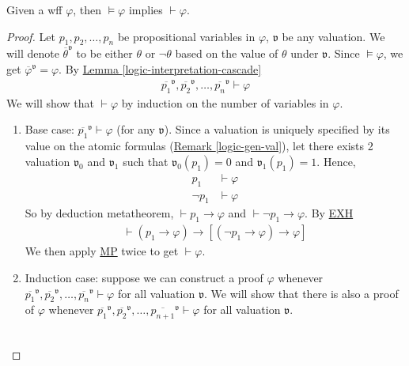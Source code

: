 \documentclass{treatise}
\begin{document}
\begin{theorem}
Given a wff $\varphi$, then $\vDash \varphi$ implies $\vdash \varphi$.
\end{theorem}
\begin{proof}
Let $p_1, p_2, \hdots, p_n$ be propositional variables in $\varphi$, $\mathfrak{v}$ be any valuation. We will denote $\overline{\theta}^\mathfrak{v}$ to be either $\theta$ or $\neg \theta$ based on the value of $\theta$ under $\mathfrak{v}$. Since $\vDash \varphi$, we get $\overline{\varphi}^\mathfrak{v} = \varphi$. By \hyperref[logic-interpretation-cascade]{Lemma \ref*{logic-interpretation-cascade}}
\begin{align*}
    \overline{p_1}^\mathfrak{v}, \overline{p_2}^\mathfrak{v}, \hdots, \overline{p_n}^\mathfrak{v} \vdash \varphi
\end{align*}
We will show that $\vdash \varphi$ by induction on the number of variables in $\varphi$.
\begin{enumerate}
    \item Base case: $\overline{p_1}^\mathfrak{v} \vdash \varphi$ (for any $\mathfrak{v}$). Since a valuation is uniquely specified by its value on the atomic formulas (\hyperref[logic-gen-val]{Remark \ref*{logic-gen-val}}), let there exists 2 valuation $\mathfrak{v}_0$ and $\mathfrak{v}_1$ such that $\mathfrak{v}_0 (p_1) = 0$ and $\mathfrak{v}_1 (p_1) = 1$. Hence,
    \begin{align*}
        p_1 & \vdash \varphi
        \\
        \neg p_1 & \vdash \varphi
    \end{align*}
    So by deduction metatheorem, $\vdash p_1 \to \varphi$ and $\vdash \neg p_1 \to \varphi$. By \hyperref[HPL-T-EXH]{EXH}
    \begin{align*}
        \vdash (p_1 \to \varphi) \to [(\neg p_1 \to \varphi) \to \varphi]
    \end{align*}
    We then apply \hyperref[HPL-R-MP]{MP} twice to get $\vdash \varphi$.
    \item Induction case: suppose we can construct a proof $\varphi$ whenever $\overline{p_1}^\mathfrak{v}, \overline{p_2}^\mathfrak{v}, \hdots, \overline{p_n}^\mathfrak{v} \vdash \varphi$ for all valuation $\mathfrak{v}$. We will show that there is also a proof of $\varphi$ whenever $\overline{p_1}^\mathfrak{v}, \overline{p_2}^\mathfrak{v}, \hdots, \overline{p_{n + 1}}^\mathfrak{v} \vdash \varphi$ for all valuation $\mathfrak{v}$.
    \\
    \\

\end{enumerate}
\end{proof}
\end{document}
